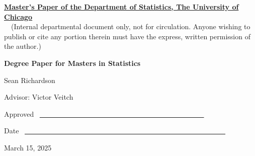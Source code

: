 \documentclass{article}
\theoremstyle{definition}
\begin{document}
    
    \noindent
    \thispagestyle{empty}
    \underline{\bf Master's Paper of the Department of Statistics, The University of Chicago}
    \\~~(Internal departmental document only, not for circulation. Anyone wishing to publish or cite any portion therein must have the express, written permission of the author.)
    
    \vspace{1.8in}
    \begin{center}
    {\bf\LARGE Degree Paper for Masters in Statistics}
    
    \vspace{1.4in}
    {\Large Sean Richardson}
    
    \vspace{1.3in}
    {\Large Advisor: Victor Veitch}
    
    \end{center}
    
    \vspace{.6in}
    {\Large Approved} ~\underline{~~~~~~~~~~~~~~~~~~
    ~~~~~~~~~~~~~~~~~~~~~~~~~~~~}
    
    \vspace{.2in}
    {\Large Date} ~\underline{~~~~~~~~~~~~~~~~~~~~~~~~~~~~~~~~~~~~~~~~~~~~~~~~~~~~~~~~~}
    
    \vfill
    \begin{center}{\large March 15, 2025}\end{center}
    
\end{document}
